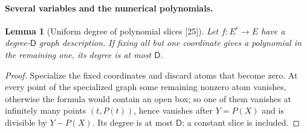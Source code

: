 \documentclass[11pt,letterpaper]{article}
\numberwithin{equation}{section}
\newtheorem{lemma}[lemma]{Lemma}
\theoremstyle{definition}
\theoremstyle{remark}
\theoremstyle{plain}
\newcommand{\src}[1]{\textup{\textsf{[#1]}}}
\begin{document}
\paragraph{Several variables and the numerical polynomials.}

\begin{lemma}[Uniform degree of polynomial slices \src{25}]\label{osq:sa:lem:slices}
Let $f:E^r\to E$ have a degree-$\mathsf D$ graph description. If fixing all but one coordinate gives a polynomial in the remaining one, its degree is at
most $\mathsf D$.
\end{lemma}
\begin{proof}
Specialize the fixed coordinates and discard atoms that become zero. At every point of the specialized graph some remaining nonzero atom vanishes,
otherwise the formula would contain an open box; so one of them vanishes at infinitely many points $(t,P(t))$, hence vanishes after $Y=P(X)$ and is
divisible by $Y-P(X)$. Its degree is at most $\mathsf D$; a constant slice is included.
\end{proof}
\end{document}
